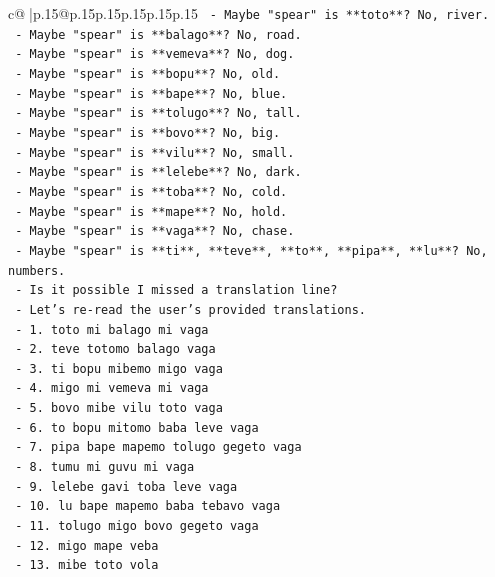 \documentclass{article}
\begin{document}
{\begin{supertabular}{c@{$\;$}|p{.15\linewidth}@{}p{.15\linewidth}p{.15\linewidth}p{.15\linewidth}p{.15\linewidth}p{.15\linewidth}}
{{{\texttt{    {-} Maybe "spear" is **toto**? No, river.} \\
\texttt{    {-} Maybe "spear" is **balago**? No, road.} \\
\texttt{    {-} Maybe "spear" is **vemeva**? No, dog.} \\
\texttt{    {-} Maybe "spear" is **bopu**? No, old.} \\
\texttt{    {-} Maybe "spear" is **bape**? No, blue.} \\
\texttt{    {-} Maybe "spear" is **tolugo**? No, tall.} \\
\texttt{    {-} Maybe "spear" is **bovo**? No, big.} \\
\texttt{    {-} Maybe "spear" is **vilu**? No, small.} \\
\texttt{    {-} Maybe "spear" is **lelebe**? No, dark.} \\
\texttt{    {-} Maybe "spear" is **toba**? No, cold.} \\
\texttt{    {-} Maybe "spear" is **mape**? No, hold.} \\
\texttt{    {-} Maybe "spear" is **vaga**? No, chase.} \\
\texttt{    {-} Maybe "spear" is **ti**, **teve**, **to**, **pipa**, **lu**? No, numbers.} \\
\texttt{    {-} Is it possible I missed a translation line?} \\
\texttt{    {-} Let's re{-}read the user's provided translations.} \\
\texttt{    {-} 1. toto mi balago mi vaga} \\
\texttt{    {-} 2. teve totomo balago vaga} \\
\texttt{    {-} 3. ti bopu mibemo migo vaga} \\
\texttt{    {-} 4. migo mi vemeva mi vaga} \\
\texttt{    {-} 5. bovo mibe vilu toto vaga} \\
\texttt{    {-} 6. to bopu mitomo baba leve vaga} \\
\texttt{    {-} 7. pipa bape mapemo tolugo gegeto vaga} \\
\texttt{    {-} 8. tumu mi guvu mi vaga} \\
\texttt{    {-} 9. lelebe gavi toba leve vaga} \\
\texttt{    {-} 10. lu bape mapemo baba tebavo vaga} \\
\texttt{    {-} 11. tolugo migo bovo gegeto vaga} \\
\texttt{    {-} 12. migo mape veba} \\
\texttt{    {-} 13. mibe toto vola} \\
}}}
\end{supertabular}}
\end{document}
